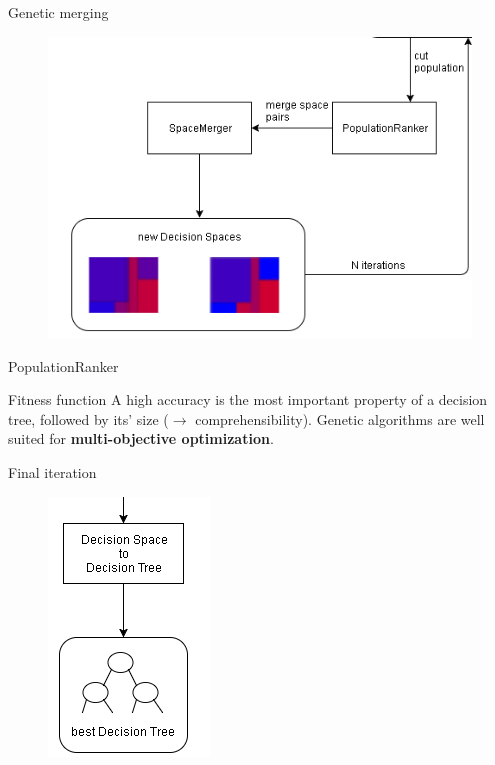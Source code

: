 \documentclass[english]{beamer}
\begin{document}
{
\begin{frame}{Genetic merging}
	\begin{figure}
		\centering
		\includegraphics[scale=0.7]{figures/genetic_merging.png}
	\end{figure}
\end{frame} }

\begin{frame}{PopulationRanker}
	\begin{block}{Fitness function}
		A high accuracy is the most important property of a decision tree, followed by its' size ($\rightarrow$ comprehensibility). Genetic algorithms are well suited for \textbf{multi-objective optimization}.
	\end{block}
\end{frame}

{
\begin{frame}{Final iteration}
	\vspace{-1em}
	\begin{figure}
		\centering
		\includegraphics[scale=1]{figures/final_iteration.png}
	\end{figure}
\end{frame} }
\end{document}
